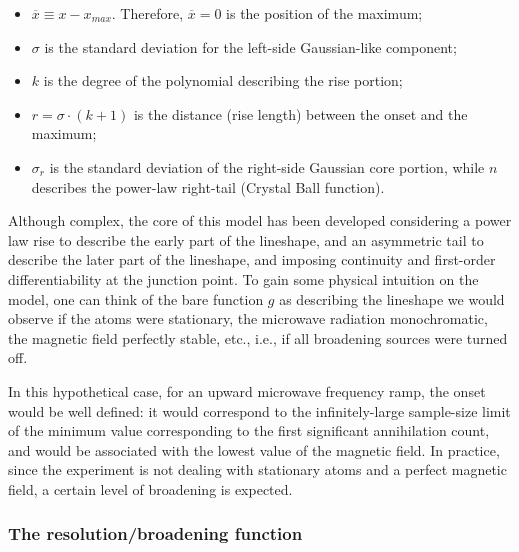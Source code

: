\begin{itemize}
    \item $\overline{x} \equiv x - x_{max}$. Therefore, $\overline{x} = 0$ is the position of the maximum;
    \item $\sigma$ is the standard deviation for the left-side Gaussian-like component;
    \item $k$ is the degree of the polynomial describing the rise portion; 
    \item $r = \sigma \cdot (k + 1)$ is the distance (rise length) between the onset and the maximum;
    \item $\sigma_{r}$ is the  standard deviation of the right-side Gaussian core portion, while $n$ describes the power-law right-tail (Crystal Ball function).  
\end{itemize}

Although complex, the core of this model has been developed considering a power law rise to describe the early part of the lineshape, and an asymmetric tail to describe the later part of the lineshape, and imposing continuity and first-order differentiability at the junction point.
To gain some physical intuition on the model, one can think of the bare function $g$ as describing the lineshape we would observe if the atoms were stationary, the microwave radiation monochromatic, the magnetic field perfectly stable, etc., i.e., if all broadening sources were turned off. 

In this hypothetical case, for an upward microwave frequency ramp, the onset would be well defined: it would correspond to the infinitely-large sample-size limit of the minimum value corresponding to the first significant annihilation count, and would be associated with the lowest value of the magnetic field. In practice, since the experiment is not dealing with stationary atoms and a perfect magnetic field, a certain level of broadening is expected.

\subsubsection{The resolution/broadening function} \label{sec:resolutionF}


